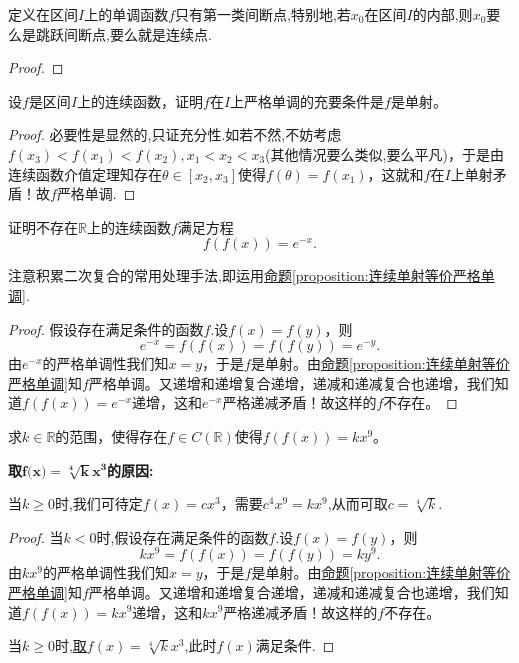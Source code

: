 \documentclass[../../main.tex]{subfiles}
\begin{document}
\begin{proposition}\label{proposition:单调函数只有第一类间断点}
定义在区间$I$上的单调函数$f$只有第一类间断点,特别地,若$x_0$在区间$I$的内部,则$x_0$要么是跳跃间断点,要么就是连续点.
\end{proposition}
\begin{proof}

\end{proof}

\begin{proposition}[连续单射等价严格单调]\label{proposition:连续单射等价严格单调}
设\(f\)是区间\(I\)上的连续函数，证明\(f\)在\(I\)上严格单调的充要条件是\(f\)是单射。
\end{proposition}
\begin{proof}
必要性是显然的,只证充分性.如若不然,不妨考虑\(f(x_3)<f(x_1)<f(x_2),x_1<x_2<x_3\)(其他情况要么类似,要么平凡)，于是由连续函数介值定理知存在\(\theta\in[x_2,x_3]\)使得\(f(\theta)=f(x_1)\)，这就和\(f\)在\(I\)上单射矛盾！故\(f\)严格单调.
\end{proof}

\begin{example}
证明不存在\(\mathbb{R}\)上的连续函数\(f\)满足方程
\[
f(f(x)) = e^{-x}.
\]
\end{example}
\begin{note}
注意积累二次复合的常用处理手法,即运用\hyperref[proposition:连续单射等价严格单调]{命题\ref{proposition:连续单射等价严格单调}}.
\end{note}
\begin{proof}
假设存在满足条件的函数$f$.设\(f(x)=f(y)\)，则
\[
e^{-x}=f(f(x)) = f(f(y)) = e^{-y}.
\]
由\(e^{-x}\)的严格单调性我们知\(x = y\)，于是\(f\)是单射。由\hyperref[proposition:连续单射等价严格单调]{命题\ref{proposition:连续单射等价严格单调}}知\(f\)严格单调。又递增和递增复合递增，递减和递减复合也递增，我们知道\(f(f(x)) = e^{-x}\)递增，这和\(e^{-x}\)严格递减矛盾！故这样的\(f\)不存在。
\end{proof}

\begin{example}
求\(k\in\mathbb{R}\)的范围，使得存在\(f\in C(\mathbb{R})\)使得\(f(f(x)) = kx^{9}\)。
\end{example}
\begin{note}
\hypertarget{取这个函数的原因}{\textbf{取$\boldsymbol{f}\mathbf{(}\boldsymbol{x}\mathbf{)}=\sqrt[\mathbf{4}]{\boldsymbol{k}}\boldsymbol{x}^{\mathbf{3}}$的原因:}}当\(k\geqslant0\)时,我们可待定\(f(x)=cx^{3}\)，需要\(c^{4}x^{9}=kx^{9}\),从而可取\(c = \sqrt[4]{k}\).
\end{note}
\begin{proof}
当$k<0$时,假设存在满足条件的函数$f$.设\(f(x)=f(y)\)，则
\[
kx^{9}=f(f(x)) = f(f(y)) = ky^{9}.
\]
由\(kx^{9}\)的严格单调性我们知\(x = y\)，于是\(f\)是单射。由\hyperref[proposition:连续单射等价严格单调]{命题\ref{proposition:连续单射等价严格单调}}知\(f\)严格单调。又递增和递增复合递增，递减和递减复合也递增，我们知道\(f(f(x)) = kx^{9}\)递增，这和\(kx^{9}\)严格递减矛盾！故这样的\(f\)不存在。

当\(k\geqslant0\)时,\hyperlink{取这个函数的原因}{取$f(x)=\sqrt[4]{k}x^3$},此时$f(x)$满足条件.
\end{proof}
\end{document}
